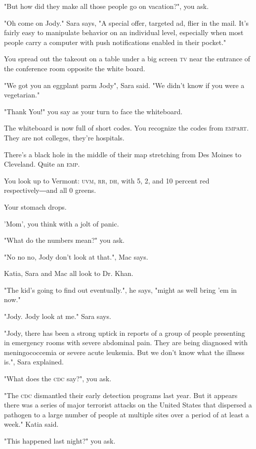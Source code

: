 \documentclass[a5paper, symmetric]{tufte-book}
\begin{document}
"But how did they make all those people go on vacation?", you ask. 

"Oh come on Jody." Sara says, "A special offer, targeted ad, flier in the mail. It's fairly easy to manipulate behavior on an individual level, especially when most people carry a computer with push notifications enabled in their pocket."

You spread out the takeout on a table under a big screen \textsc{tv} near the entrance of the conference room opposite the white board. 

"We got you an eggplant parm Jody", Sara said. "We didn't know if you were a vegetarian." 

"Thank You!" you say as your turn to face the whiteboard. 

The whiteboard is now full of short codes. You recognize the codes from \textsc{empart}. They are not colleges, they're hospitals. 

There's a black hole in the middle of their map stretching from Des Moines to Cleveland. Quite an \textsc{emp}.

You look up to Vermont: \textsc{uvm}, \textsc{rr}, \textsc{dh}, with 5, 2, and 10 percent red respectively―and all 0 greens. 

Your stomach drops.

'Mom', you think with a jolt of panic. 

"What do the numbers mean?" you ask. 

"No no no, Jody don't look at that.", Mac says.

Katia, Sara and Mac all look to Dr. Khan. 

"The kid's going to find out eventually.", he says, "might as well bring 'em in now."

"Jody. Jody look at me." Sara says. 

"Jody, there has been a strong uptick in reports of a group of people presenting in emergency rooms with severe abdominal pain. They are being diagnosed with meningococcemia or severe acute leukemia. But we don't know what the illness is.", Sara explained. 

"What does the \textsc{cdc} say?", you ask. 

"The \textsc{cdc} dismantled their early detection programs last year. But it appears there was a series of major terrorist attacks on the United States that dispersed a pathogen to a large number of people at multiple sites over a period of at least a week." Katia said. 

"This happened last night?" you ask. 
\end{document}
